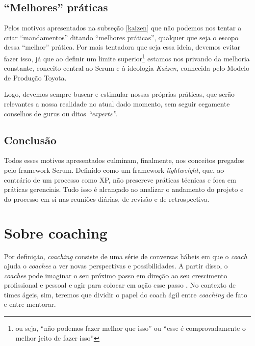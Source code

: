 \documentclass{iiufrgs}
\begin{document}
\subsection{\enquote{Melhores} práticas}\label{melhores}

Pelos motivos apresentados na subseção \ref{kaizen} que não podemos nos tentar a criar \enquote{mandamentos} ditando \enquote{melhores práticas}, qualquer que seja o escopo dessa \enquote{melhor} prática. Por mais tentadora que seja essa ideia, devemos evitar fazer isso, já que ao definir um limite superior\footnote{ou seja, \enquote{não podemos fazer melhor que isso} ou \enquote{esse é comprovadamente o melhor jeito de fazer isso}} estamos nos privando da melhoria constante, conceito central ao Scrum e à ideologia \textit{Kaizen}, conhecida pelo Modelo de Produção Toyota.

Logo, devemos sempre buscar e estimular nossas próprias práticas, que serão relevantes a nossa realidade no atual dado momento, sem seguir cegamente conselhos de gurus ou ditos \textit{\enquote{experts}}. 

\subsection{Conclusão}

Todos esses motivos apresentados culminam, finalmente, nos conceitos pregados pelo framework Scrum. Definido como um framework \textit{lightweight}, que, ao contrário de um processo como XP, não prescreve práticas técnicas e foca em práticas gerenciais. Tudo isso é alcançado ao analizar o andamento do projeto e do processo em si nas reuniões diárias, de revisão e de retrospectiva.



\section{Sobre coaching}\label{coaching}

Por definição, \textit{coaching} consiste de uma série de conversas hábeis em que o \textit{coach} ajuda o \textit{coachee} a ver novas perspectivas e possibilidades. A partir disso, o \textit{coachee} pode imaginar o seu próximo passo em direção ao seu crescimento profissional e pessoal e agir para colocar em ação esse passo \cite{Adkins2010Coaching}. No contexto de times ágeis, sim, teremos que dividir o papel do coach ágil entre \textit{coaching} de fato e entre mentorar.
\end{document}
